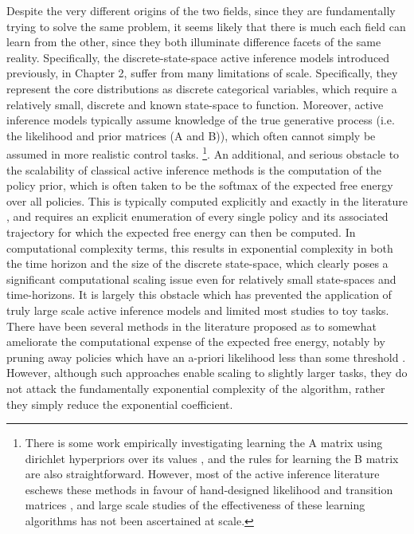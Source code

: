 Despite the very different origins of the two fields, since they are fundamentally trying to solve the same problem, it seems likely that there is much each field can learn from the other, since they both illuminate difference facets of the same reality. Specifically, the discrete-state-space active inference models introduced previously, in Chapter 2, suffer from many limitations of scale. Specifically, they represent the core distributions as discrete categorical variables, which require a relatively small, discrete and known state-space to function. Moreover, active inference models typically assume knowledge of the true generative process (i.e. the likelihood and prior matrices (A and B)), which often cannot simply be assumed in more realistic control tasks. \footnote{There is some work empirically investigating learning the A matrix using dirichlet hyperpriors over its values \citep{schwartenbeck_computational_2019}, and the rules for learning the B matrix are also straightforward. However, most of the active inference literature eschews these methods in favour of hand-designed likelihood and transition matrices \citep{friston_active_2015,friston2012active,parr2017uncertainty,friston_deep_2018}, and large scale studies of the effectiveness of these learning algorithms has not been ascertained at scale.}. An additional, and serious obstacle to the scalability of classical active inference methods is the computation of the policy prior, which is often taken to be the softmax of the expected free energy over all policies. This is typically computed explicitly and exactly in the literature \citep{da2020active,friston_active_2015}, and requires an explicit enumeration of every single policy and its associated trajectory for which the expected free energy can then be computed. In computational complexity terms, this results in exponential complexity in both the time horizon and the size of the discrete state-space, which clearly poses a significant computational scaling issue even for relatively small state-spaces and time-horizons. It is largely this obstacle which has prevented the application of truly large scale active inference models and limited most studies to toy tasks. There have been several methods in the literature proposed as to somewhat ameliorate the computational expense of the expected free energy, notably by pruning away policies which have an a-priori likelihood less than some threshold \citep{friston2020sophisticated}. However, although such approaches enable scaling to slightly larger tasks, they do not attack the fundamentally exponential complexity of the algorithm, rather they simply reduce the exponential coefficient.

